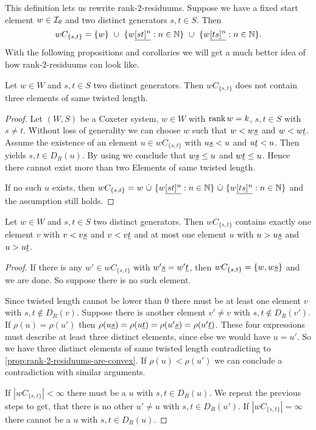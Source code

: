 This definition lets us rewrite rank-2-residuums. Suppose we have a fixed start element $w \in \mathcal{I}_{\theta}$ and two distinct generators $s,t \in S$. Then
$$ wC_{\{s,t\}} = \{ w \} \ \cup \ \{ w \underline{[st]^n} : n \in \mathbb{N} \} \ \cup \ \{ w \underline{[ts]^n} : n \in \mathbb{N} \}. $$
With the following propositions and corollaries we will get a much better idea of how rank-2-residuums can look like.

\begin{prop}
	Let $w \in W$ and $s,t \in S$ two distinct generators. Then $wC_{\{s,t\}}$ does not contain three elements of same twisted length.

	\begin{proof}
		Let $(W,S)$ be a Coxeter system, $w \in W$ with $\operatorname{rank} w = k$, $s, t \in S$ with $s \neq t$. Without loss of generality we can choose $w$ such that $w < w \underline{s}$ and $w < w \underline{t}$. Assume the existence of an element $u \in wC_{\{s,t\}}$ with $u \underline{s} < u$ and $u \underline{t} < u$. Then \cite[Lemma 3.8]{hultman:comb-twisted-invo} yields $s,t \in D_R(u)$. By using \cite[Lemma 3.9]{hultman:comb-twisted-invo} we conclude that $w \underline{s} \leq u$ and $w \underline{t} \leq u$. Hence there cannot exist more than two Elements of same twisted length.

		If no such $u$ exists, then $wC_{\{s,t\}} = w \ \dot \cup \ \{ w \ul{[st]^n} : n \in \nn \} \ \dot \cup \ \{ w \ul{[ts]^n} : n \in \nn \}$ and the assumption still holds.
	\end{proof}
\end{prop}

\begin{coro}
	Let $w \in W$ and $s,t \in S$ two distinct generators. Then $wC_{\{s,t\}}$ contains exactly one element $v$ with $v < v \underline{s}$ and $v < v \underline{t}$ and at most one element $u$ with $u > u \underline{s}$ and $u > u \underline{t}$.

	\begin{proof}
		If there is any $w' \in wC_{\{s,t\}}$ with $w' \underline{s} = w' \underline{t}$, then $wC_{\{s,t\}} = \{ w, w \underline{s} \}$ and we are done. So suppose there is no such element.

		Since twisted length cannot be lower than 0 there must be at least one element $v$ with $s,t \notin D_R(v)$. Suppose there is another element $v' \neq v$ with $s,t \notin D_R(v')$. If $\rho(u) = \rho(u')$ then $\rho(u \underline{s}) = \rho(u \underline{t}) = \rho(u' \underline{s}) = \rho(u' \underline{t})$. These four expressions must describe at least three distinct elements, since else we would have $u = u'$. So we have three distinct elements of same twisted length contradicting to \ref{prop:rank-2-residuums-are-convex}. If $\rho(u) < \rho(u')$ we can conclude a contradiction with similar arguments.

		If $|wC_{\{s,t\}}| < \infty$ there must be a $u$ with $s,t \in D_R(u)$. We repeat the previous steps to get, that there is no other $u' \neq u$ with $s,t \in D_R(u')$. If $|wC_{\{s,t\}}| = \infty$ there cannot be a $u$ with $s,t \in D_R(u)$.
	\end{proof}
\end{coro}

